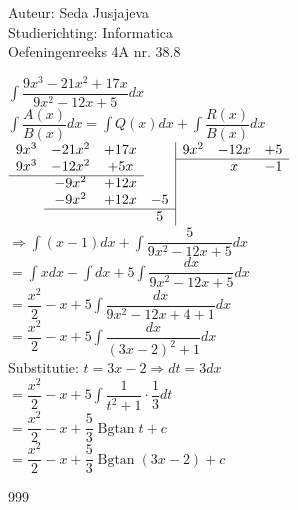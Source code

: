 \documentclass[a4paper]{article}
\newcommand{\integral}{\displaystyle\int}
\begin{document}
\noindent \large Auteur: Seda Jusjajeva\\
\noindent \large Studierichting: Informatica\\
\noindent \large Oefeningenreeks 4A nr. 38.8\\

\medskip

\normalsize

$\integral\dfrac{9x^3 - 21x^2 + 17x}{9x^2 - 12x + 5}dx$ \\

$\integral\dfrac{A(x)}{B(x)}dx = \integral Q(x)dx + \integral\dfrac{R(x)}{B(x)}dx$ \\

$\begin{array}{cccc|cccc}
    9x^3 & -21x^2 & +17x &    & 9x^2 & -12x & +5 \\ 
                              \cline{5-7}
    9x^3 & -12x^2 & +5x  &    &      & x    & -1 \\ 
    \cline{1-3}
         & -9x^2  & +12x &    &      &      &    \\
         & -9x^2  & +12x & -5 &      &      &    \\ 
         \cline{2-4}
         &        &      & 5  &      &      &    \\
\end{array}$ \\

$\Rightarrow \integral\left(x - 1\right)dx + \integral\dfrac{5}{9x^2 - 12x + 5}dx$ \\

$= \integral x dx - \integral dx + 5\integral\dfrac{dx}{9x^2 - 12x + 5}dx$ \\

$= \dfrac{x^2}{2} - x + 5\integral \dfrac{dx}{9x^2 - 12x + 4 + 1}dx$ \\

$= \dfrac{x^2}{2} - x + 5\integral \dfrac{dx}{(3x - 2)^2 + 1}dx$ \\

Substitutie: $t = 3x - 2 \Rightarrow dt = 3dx$ \\

$= \dfrac{x^2}{2} - x + 5\integral \dfrac{1}{t^2 + 1}\cdot\dfrac{1}{3}dt$ \\

$= \dfrac{x^2}{2} - x + \dfrac{5}{3}\operatorname{Bgtan}t + c$ \\

$= \dfrac{x^2}{2} - x + \dfrac{5}{3}\operatorname{Bgtan}(3x - 2) + c$ \\


\begin{thebibliography}{999}
\end{thebibliography}
\end{document}
